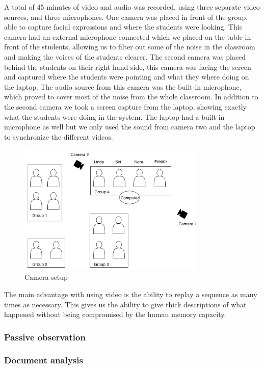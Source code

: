 A total of 45 minutes of video and audio was recorded, using three separate video sources, and three microphones. One camera was placed in front of the group, able to capture facial expressions and where the students were looking. This camera had an external microphone connected which we placed on the table in front of the students, allowing us to filter out some of the noise in the classroom and making the voices of the students clearer. The second camera was placed behind the students on their right hand side, this camera was facing the screen and captured where the students were pointing and what they where doing on the laptop. The audio source from this camera was the built-in microphone, which proved to cover most of the noise from the whole classroom. In addition to the second camera we took a screen capture from the laptop, showing exactly what the students were doing in the system. The laptop had a built-in microphone as well but we only used the sound from camera two and the laptop to synchronize the different videos.
\begin{figure}
\centering
\includegraphics[width=0.8\textwidth]{img/empiricalsetting/class_diagram.png}
\caption{Camera setup}
\label{fig:camerasetup}
\end{figure}

The main advantage with using video is the ability to replay a sequence as many times as necessary. This gives us the ability to give thick descriptions of what happened without being compromised by the human memory capacity.

\subsubsection{Passive observation}

\subsubsection{Document analysis}


